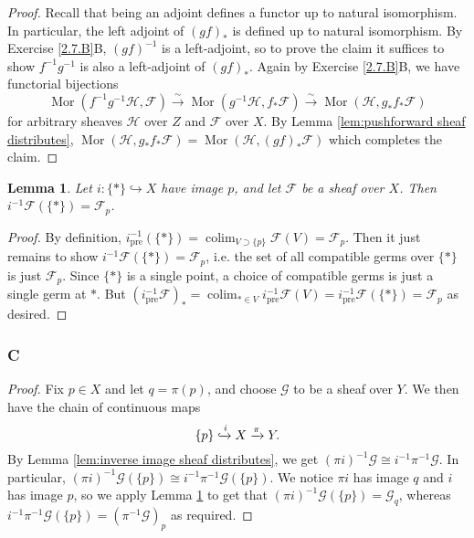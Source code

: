\documentclass{article}
\newcommand{\fF}{\mathscr{F}}
\newcommand{\fG}{\mathscr{G}}
\newcommand{\fH}{\mathscr{H}}
\DeclareMathOperator{\pre}{pre}
\DeclareMathOperator{\colim}{colim}
\DeclareMathOperator{\Mor}{Mor}
\newtheorem{lemma}[theorem]{Lemma}
\begin{document}
    \begin{proof}
        Recall that being an adjoint defines a functor up to natural isomorphism. In particular, the left adjoint of $(gf)_*$ is defined up to natural isomorphism. By Exercise \ref{2.7.B}B, $(gf)^{-1}$ is a left-adjoint, so to prove the claim it suffices to show $f^{-1}g^{-1}$ is also a left-adjoint of $(gf)_*$. Again by Exercise \ref{2.7.B}B, we have functorial bijections
        \[
        \Mor(f^{-1}g^{-1}\fH, \fF) \xrightarrow{\sim} \Mor(g^{-1} \fH, f_* \fF) \xrightarrow{\sim } \Mor(\fH, g_* f_* \fF)
        \]
        for arbitrary sheaves $\fH$ over $Z$ and $\fF$ over $X$. By Lemma \ref{lem:pushforward sheaf distributes}, $\Mor(\fH,g_*f_*\fF)= \Mor(\fH, (gf)_* \fF)$ which completes the claim.
    \end{proof}
    \begin{lemma}\label{lem:stalk as inverse image sheaf}
        Let $i:\{*\}\hookrightarrow X$ have image $p$, and let $\fF$ be a sheaf over $X$. Then $i^{-1} \fF(\{*\})=\fF_p$.
    \end{lemma}
    \begin{proof}
        By definition, $i^{-1}_{\pre}(\{*\})=\colim_{V\supset \{p\}} \fF(V) = \fF_p$. Then it just remains to show $i^{-1} \fF(\{*\}) = \fF_p$, i.e. the set of all compatible germs over $\{*\}$ is just $\fF_p$. Since $\{*\}$ is a single point, a choice of compatible germs is just a single germ at $*$. But $(i^{-1}_{\pre} \fF)_*=\colim_{*\in V} i^{-1}_{\pre} \fF(V)= i^{-1}_{\pre} \fF(\{*\})= \fF_p$ as desired. 
    \end{proof}
\subsubsection{C}\label{2.7.C}
\begin{proof}
    Fix $p\in X$ and let $q=\pi(p)$, and choose $\fG$ to be a sheaf over $Y$. We then have the chain of continuous maps $$\{p\} \xhookrightarrow{i}X \xrightarrow{\pi}Y.$$ By Lemma \ref{lem:inverse image sheaf distributes}, we get $(\pi  i)^{-1} \fG \cong i^{-1} \pi^{-1} \fG$. In particular, $(\pi i)^{-1} \fG(\{p\}) \cong i^{-1} \pi^{-1} \fG(\{p\})$. We notice $\pi i$ has image $q$ and $i$ has image $p$, so we apply Lemma \ref{lem:stalk as inverse image sheaf} to get that $(\pi i)^{-1} \fG(\{p\})=\fG_q$, whereas $i^{-1} \pi^{-1} \fG(\{p\}) = (\pi^{-1} \fG)_p$ as required.
\end{proof}
\end{document}
